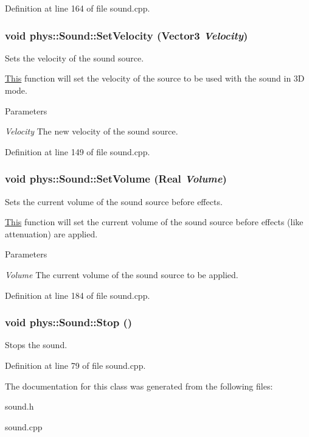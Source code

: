 Definition at line 164 of file sound.cpp.

\hypertarget{classphys_1_1Sound_a673a0ab44fa32fdcd15180e813b7b02b}{
\subsubsection[{SetVelocity}]{\setlength{\rightskip}{0pt plus 5cm}void phys::Sound::SetVelocity ({\bf Vector3} {\em Velocity})}}
\label{dc/d2f/classphys_1_1Sound_a673a0ab44fa32fdcd15180e813b7b02b}


Sets the velocity of the sound source. 

\hyperlink{structThis}{This} function will set the velocity of the source to be used with the sound in 3D mode. 
\begin{DoxyParams}{Parameters}
\item[{\em Velocity}]The new velocity of the sound source. \end{DoxyParams}


Definition at line 149 of file sound.cpp.

\hypertarget{classphys_1_1Sound_a62438fb7916e1e7e9abe66722de83821}{
\subsubsection[{SetVolume}]{\setlength{\rightskip}{0pt plus 5cm}void phys::Sound::SetVolume ({\bf Real} {\em Volume})}}
\label{dc/d2f/classphys_1_1Sound_a62438fb7916e1e7e9abe66722de83821}


Sets the current volume of the sound source before effects. 

\hyperlink{structThis}{This} function will set the current volume of the sound source before effects (like attenuation) are applied. 
\begin{DoxyParams}{Parameters}
\item[{\em Volume}]The current volume of the sound source to be applied. \end{DoxyParams}


Definition at line 184 of file sound.cpp.

\hypertarget{classphys_1_1Sound_a662d760ec0e6214537b13810a8ac9955}{
\subsubsection[{Stop}]{\setlength{\rightskip}{0pt plus 5cm}void phys::Sound::Stop ()}}
\label{dc/d2f/classphys_1_1Sound_a662d760ec0e6214537b13810a8ac9955}
Stops the sound. 

Definition at line 79 of file sound.cpp.



The documentation for this class was generated from the following files:\begin{DoxyCompactItemize}
\item 
sound.h\item 
sound.cpp\end{DoxyCompactItemize}
